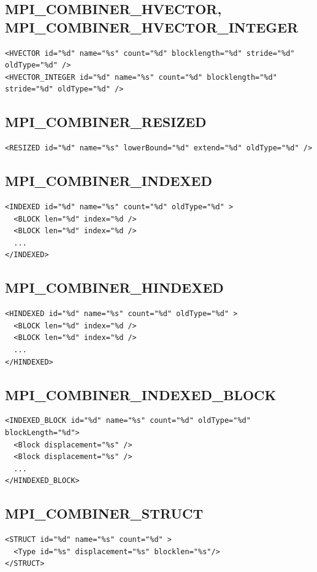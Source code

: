 \documentclass[a4paper,12pt,pdftex]{scrartcl}
\begin{document}
\subsection{MPI\_COMBINER\_HVECTOR, MPI\_COMBINER\_HVECTOR\_INTEGER}
\begin{lstlisting}
<HVECTOR id="%d" name="%s" count="%d" blocklength="%d" stride="%d" oldType="%d" /> 
<HVECTOR_INTEGER id="%d" name="%s" count="%d" blocklength="%d" stride="%d" oldType="%d" /> 
\end{lstlisting}

\subsection{MPI\_COMBINER\_RESIZED}

\begin{lstlisting}
<RESIZED id="%d" name="%s" lowerBound="%d" extend="%d" oldType="%d" />
\end{lstlisting}

\subsection{MPI\_COMBINER\_INDEXED}
\begin{lstlisting}
<INDEXED id="%d" name="%s" count="%d" oldType="%d" >
  <BLOCK len="%d" index="%d />
  <BLOCK len="%d" index="%d />
  ...
</INDEXED>
\end{lstlisting}

\subsection{MPI\_COMBINER\_HINDEXED}
\begin{lstlisting}
<HINDEXED id="%d" name="%s" count="%d" oldType="%d" >
  <BLOCK len="%d" index="%d />
  <BLOCK len="%d" index="%d />
  ...
</HINDEXED>
\end{lstlisting}

\subsection{MPI\_COMBINER\_INDEXED\_BLOCK}
\begin{lstlisting}
<INDEXED_BLOCK id="%d" name="%s" count="%d" oldType="%d" blockLength="%d">
  <Block displacement="%s" />
  <Block displacement="%s" />
  ...
</HINDEXED_BLOCK>
\end{lstlisting}

\subsection{MPI\_COMBINER\_STRUCT}
\begin{lstlisting}
<STRUCT id="%d" name="%s" count="%d" >
  <Type id="%s" displacement="%s" blocklen="%s"/>
</STRUCT>
\end{lstlisting}
\end{document}
